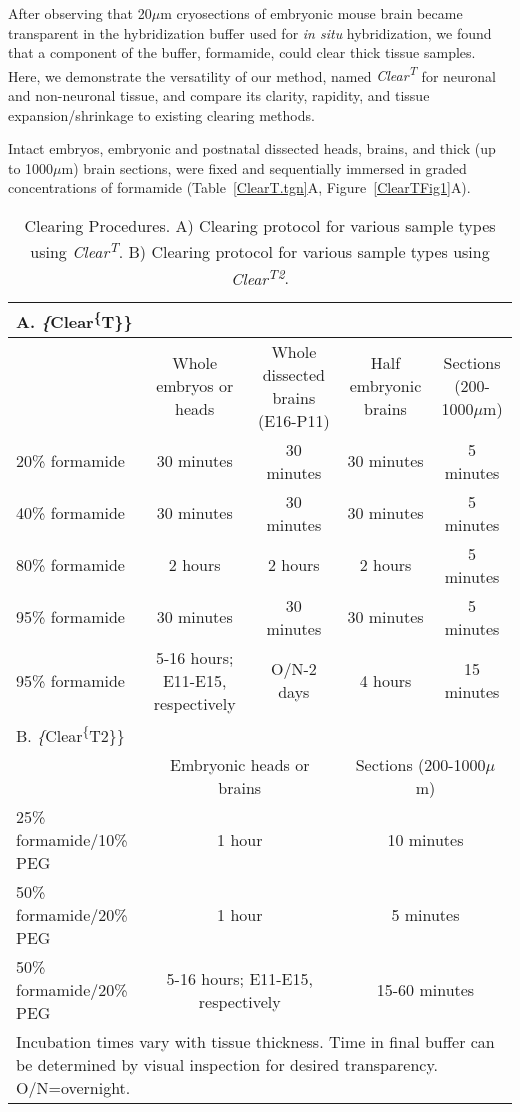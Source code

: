 After observing that 20$\mu$m cryosections of embryonic mouse brain became transparent in the hybridization buffer used for \emph{in situ} hybridization, we found that a component of the buffer, formamide, could clear thick tissue samples.
Here, we demonstrate the versatility of our method, named \emph{Clear\textsuperscript{T}} for neuronal and non-neuronal tissue, and compare its clarity, rapidity, and tissue expansion/shrinkage to existing clearing methods.

Intact embryos, embryonic and postnatal dissected heads, brains, and thick (up to 1000$\mu$m) brain sections, were fixed and sequentially immersed in graded concentrations of formamide (Table~\ref{ClearT.tgn}A, Figure~\ref{ClearTFig1}A).
\begin{table}[hbtp]
\begin{center}
\caption[Clearing Procedures]{Clearing Procedures.
A) Clearing protocol for various sample types using \emph{Clear\textsuperscript{T}}.
B) Clearing protocol for various sample types using \emph{Clear\textsuperscript{T2}}.}
\label{my-label}
\begin{tabular}{lcccc}
\multicolumn{5}{l}{A. \emph\{Clear\textsuperscript\{T\}\}} \\ \hline
& Whole embryos or heads & Whole dissected brains (E16-P11) & Half embryonic brains & Sections (200-1000$\mu$m) \\ \hline
20\% formamide & 30 minutes & 30 minutes & 30 minutes & 5 minutes \\
40\% formamide & 30 minutes & 30 minutes & 30 minutes & 5 minutes \\
80\% formamide & 2 hours & 2 hours & 2 hours & 5 minutes \\
95\% formamide & 30 minutes & 30 minutes & 30 minutes & 5 minutes \\
95\% formamide & 5-16 hours; E11-E15, respectively & O/N-2 days & 4 hours & 15 minutes \\ \hline
\multicolumn{5}{l}{B. \emph\{Clear\textsuperscript\{T2\}\}} \\ \hline
& \multicolumn{2}{c}{Embryonic heads or brains} & \multicolumn{2}{c}{Sections (200-1000$\mu$m)} \\ \hline
25\% formamide/10\% PEG & \multicolumn{2}{c}{1 hour} & \multicolumn{2}{c}{10 minutes} \\
50\% formamide/20\% PEG & \multicolumn{2}{c}{1 hour} & \multicolumn{2}{c}{5 minutes} \\
50\% formamide/20\% PEG & \multicolumn{2}{c}{5-16 hours; E11-E15, respectively} & \multicolumn{2}{c}{15-60 minutes} \\ \hline
\multicolumn{5}{l}{Incubation times vary with tissue thickness. Time in final buffer can be determined by visual inspection for desired transparency. O/N=overnight.}
\end{tabular}
\end{center}
\end{table}

